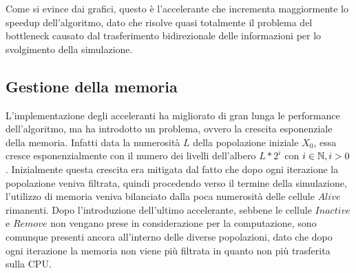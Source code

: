 \begin{figure}[H]
    \centering
    \caption{}
\end{figure}

Come si evince dai grafici, questo è l'accelerante che incrementa maggiormente
lo speedup dell'algoritmo, dato che risolve quasi totalmente il problema
del bottleneck causato dal trasferimento bidirezionale delle informazioni
per lo svolgimento della simulazione.

\subsection{Gestione della memoria}

L'implementazione degli acceleranti ha migliorato di gran lunga le
performance dell'algoritmo, ma ha introdotto un problema, ovvero la crescita
esponenziale della memoria.
Infatti data la numerosità $L$ della popolazione iniziale $X_{0}$, essa cresce
esponenzialmente con il numero dei livelli dell'albero $L * 2^i$ con
$i \in \mathbb{N}, i > 0$. Inizialmente questa crescita era mitigata dal fatto che
dopo ogni iterazione la popolazione veniva filtrata, quindi procedendo verso
il termine della simulazione, l'utilizzo di memoria veniva bilanciato dalla
poca numerosità delle cellule $Alive$ rimanenti.
Dopo l'introduzione dell'ultimo accelerante, sebbene le cellule $Inactive$ e
$Remove$ non vengano prese in considerazione per la computazione, sono
comunque presenti ancora all'interno delle diverse popolazioni, dato che
dopo ogni iterazione la memoria non viene più filtrata in quanto non più
trasferita sulla CPU.

\begin{figure}[H]
    \centering
    \caption{}
\end{figure}

